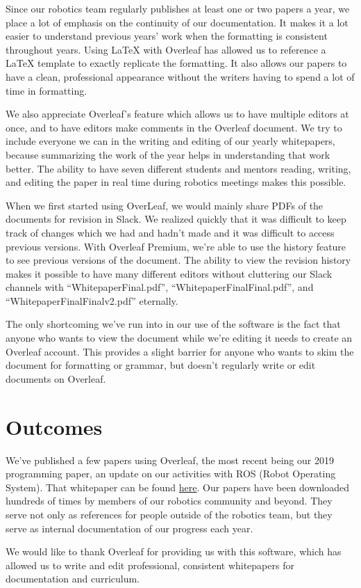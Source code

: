 \documentclass{zebracorns}
\begin{document}
Since our robotics team regularly publishes at least one or two papers a year, we place a lot of emphasis on the continuity of our documentation. It makes it a lot easier to understand previous years' work when the formatting is consistent throughout years. Using LaTeX with Overleaf has allowed us to reference a LaTeX template to exactly replicate the formatting. It also allows our papers to have a clean, professional appearance without the writers having to spend a lot of time in formatting.

We also appreciate Overleaf's feature which allows us to have multiple editors at once, and to have editors make comments in the Overleaf document. We try to include everyone we can in the writing and editing of our yearly whitepapers, because summarizing the work of the year helps in understanding that work better. The ability to have seven different students and mentors reading, writing, and editing the paper in real time during robotics meetings makes this possible. 

When we first started using OverLeaf, we would mainly share PDFs of the documents for revision in Slack. We realized quickly that it was difficult to keep track of changes which we had and hadn't made and it was difficult to access previous versions. With Overleaf Premium, we're able to use the history feature to see previous versions of the document. The ability to view the revision history makes it possible to have many different editors without cluttering our Slack channels with ``WhitepaperFinal.pdf'', ``WhitepaperFinalFinal.pdf'', and ``WhitepaperFinalFinalv2.pdf'' eternally.

The only shortcoming we've run into in our use of the software is the fact that anyone who wants to view the document while we're editing it needs to create an Overleaf account. This provides a slight barrier for anyone who wants to skim the document for formatting or grammar, but doesn't regularly write or edit documents on Overleaf.

\section{Outcomes}
We've published a few papers using Overleaf, the most recent being our 2019 programming paper, an update on our activities with ROS (Robot Operating System). That whitepaper can be found \href{https://team900.org/blog/ZebROS1.1/}{here}. Our papers have been downloaded hundreds of times by members of our robotics community and beyond. They serve not only as references for people outside of the robotics team, but they serve as internal documentation of our progress each year. 

We would like to thank Overleaf for providing us with this software, which has allowed us to write and edit professional, consistent whitepapers for documentation and curriculum.
\end{document}
